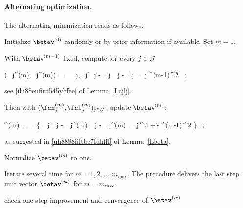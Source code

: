 \paragraph{Alternating optimization.}
The alternating minimization reads as follows.
\begin{mylist}

\item 
Initialize \( \betav^{(0)} \) randomly or by prior information if available.
Set \( m=1 \).

\item 
With \( \betav^{(m-1)} \) fixed, compute for every \( j \in \mathcal{J} \)
\begin{EQA}[c]
	(\fcn_{j}^{(m)},\fcl_{j}^{(m)})
	=
	\arginf_{\fcn_{j},\fcl_{j}} \bigl\| \Imav_{j} - \fcn_{j} \Sv_{j} - \fcl_{j} \, \UV_{j} \betav^{(m-1)} \bigr\|^{2}
	\, ;
\end{EQA}
see \eqref{ihi88eufiut545yhfee} of Lemma~\ref{Lcjlj}.

\item 
Then with \( (\fcn_{j}^{(m)},\fcl_{j}^{(m)})_{j \in \JJJ} \), update \( \betav^{(m)} \):
\begin{EQA}[c]
	\betav^{(m)}
	=
	\arginf_{\betav} \biggl\{ \sum_{j \in \JJJ} \bigl\| \Imav_{j} - \fcn_{j}^{(m)} \Sv_{j} - \fcl_{j}^{(m)} \, \UV_{j} \betav \bigr\|^{2}
	+ \lambda \| \betav - \betav^{(m-1)} \|^{2} 
	\biggr\}	
	\, ;
\end{EQA}
as suggested in \eqref{uh8888iiftbe7fuhfff} of Lemma~\ref{Lbeta}.

\item
Normalize \( \betav^{(m)} \) to one.

\item 
Iterate several time for \( m=1,2,\ldots, m_{\max} \).
The procedure delivers the last step unit vector \( \betav^{(m)} \) for \( m = m_{\max} \).
\end{mylist}

{\color{blue} check one-step improvement and convergence of \( \betav^{(m)} \)}

